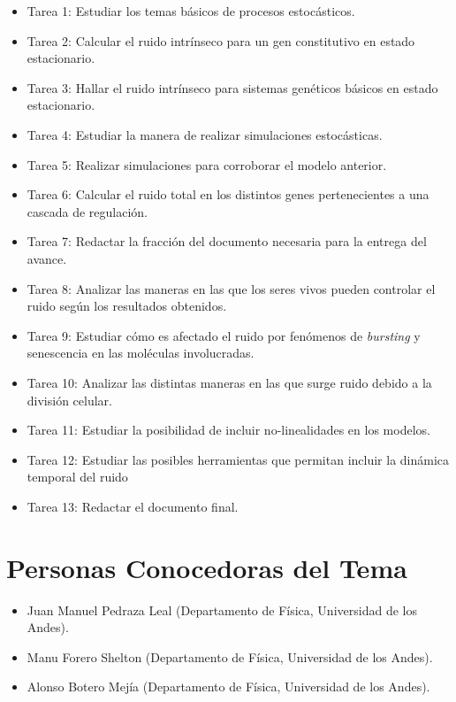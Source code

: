 \documentclass[12pt]{article}
\begin{document}
\begin{itemize}
	\item Tarea 1: Estudiar los temas b\'asicos de procesos estoc\'asticos.
	\item Tarea 2: Calcular el ruido intr\'inseco para un gen constitutivo en estado estacionario.
	\item Tarea 3: Hallar el ruido intr\'inseco para sistemas gen\'eticos b\'asicos en estado estacionario.
        \item Tarea 4: Estudiar la manera de realizar simulaciones estoc\'asticas.
        \item Tarea 5: Realizar simulaciones para corroborar el modelo anterior.
        \item Tarea 6: Calcular el ruido total en los distintos genes pertenecientes a una cascada de regulaci\'on.
        \item Tarea 7: Redactar la fracci\'on del documento necesaria para la entrega del avance.
        \item Tarea 8: Analizar las maneras en las que los seres vivos pueden controlar el ruido seg\'un los resultados obtenidos.
        \item Tarea 9: Estudiar c\'omo es afectado el ruido por fen\'omenos de \textit{bursting} y senescencia en las mol\'eculas involucradas.
        \item Tarea 10: Analizar las distintas maneras en las que surge ruido debido a la divisi\'on celular.
        \item Tarea 11: Estudiar la posibilidad de incluir no-linealidades en los modelos.
        \item Tarea 12: Estudiar las posibles herramientas que permitan incluir la din\'amica temporal del ruido
	\item Tarea 13: Redactar el documento final.
\end{itemize}

\section{Personas Conocedoras del Tema}

\begin{itemize}
	\item Juan Manuel Pedraza Leal (Departamento de F\'isica, Universidad de los Andes).
        \item Manu Forero Shelton (Departamento de F\'isica, Universidad de los Andes).
        \item Alonso Botero Mej\'ia (Departamento de F\'isica, Universidad de los Andes).
\end{itemize}
\end{document}
